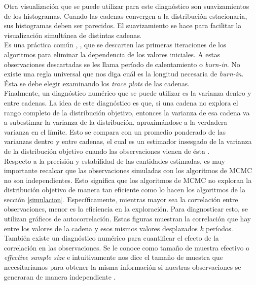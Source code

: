 \documentclass[11pt,a4paper]{article}
\begin{document}
Otra visualización que se puede utilizar para este diagnóstico son suavizamientos de los histogramas. Cuando las cadenas convergen a la distribución estacionaria, sus histogramas deben ser parecidos. El suavizamiento se hace para facilitar la visualización simultánea de distintas cadenas.\\

Es una práctica común \citep{kruschke}, \citep{gelman}, \citep{casella} que se descarten las primeras iteraciones de los algoritmos para eliminar la dependencia de los valores iniciales. A estas observaciones descartadas se les llama período de calentamiento o \textit{burn-in}. No existe una regla universal que nos diga cuál es la longitud necesaria de \textit{burn-in}. Ésta se debe elegir examinando los \textit{trace plots} de las cadenas.\\

Finalmente, un diagnóstico numérico que se puede utilizar es la varianza dentro y entre cadenas. La idea de este diagnóstico es que, si una cadena no explora el rango completo de la distribución objetivo, entonces la varianza de esa cadena va a subestimar la varianza de la distribución, aproximándose a la verdadera varianza en el límite. Esto se compara con un promedio ponderado de las varianzas dentro y entre cadenas, el cual es un estimador insesgado de la varianza de la distribución objetivo cuando las observaciones vienen de ésta \citep{gelman}.\\

Respecto a la precisión y estabilidad de las cantidades estimadas, es muy importante recalcar que las observaciones simuladas con los algoritmos de MCMC no son independientes. Esto significa que los algoritmos de MCMC no exploran la distribución objetivo de manera tan eficiente como lo hacen los algoritmos de la sección \ref{simulacion}. Específicamente, mientras mayor sea la correlación entre observaciones, menor es la eficiencia en la exploración. Para diagnosticar esto, se utilizan gráficos de autocorrelación. Estas figuras muestran la correlación que hay entre los valores de la cadena y esos mismos valores desplazados $k$ períodos.\\

También existe un diagnóstico numérico para cuantificar el efecto de la correlación en las observaciones. Se le conoce como tamaño de muestra efectivo o \textit{effective sample size} e intuitivamente nos dice el tamaño de muestra que necesitaríamos para obtener la misma información si nuestras observaciones se generaran de manera independiente \citep{kruschke}.\\
\end{document}

